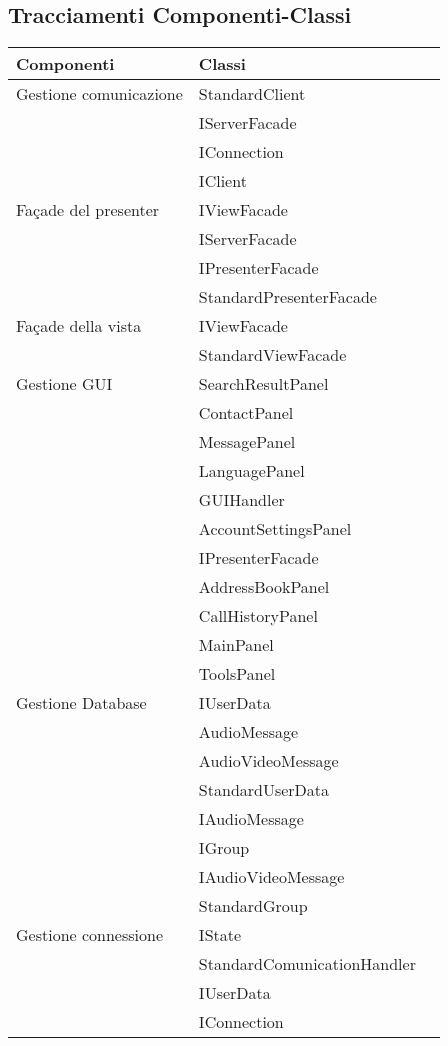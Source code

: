 \subsection{Tracciamenti Componenti-Classi}\label{sec:tracCompClass}

\begin{center}
\begin{longtable}{lp{}l}
\toprule Componenti & Classi\\
\midrule
Gestione comunicazione & StandardClient \\
 & IServerFacade \\
 & IConnection \\
 & IClient \\
Façade del presenter & IViewFacade \\
 & IServerFacade \\
 & IPresenterFacade \\
 & StandardPresenterFacade \\
Façade della vista & IViewFacade \\
 & StandardViewFacade \\
Gestione GUI & SearchResultPanel \\
 & ContactPanel \\
 & MessagePanel \\
 & LanguagePanel \\
 & GUIHandler \\
 & AccountSettingsPanel \\
 & IPresenterFacade \\
 & AddressBookPanel \\
 & CallHistoryPanel \\
 & MainPanel \\
 & ToolsPanel \\
Gestione Database & IUserData \\
 & AudioMessage \\
 & AudioVideoMessage \\
 & StandardUserData \\
 & IAudioMessage \\
 & IGroup \\
 & IAudioVideoMessage \\
 & StandardGroup \\
Gestione connessione & IState \\
 & StandardComunicationHandler \\
 & IUserData \\
 & IConnection \\

\end{longtable}
\end{center}

